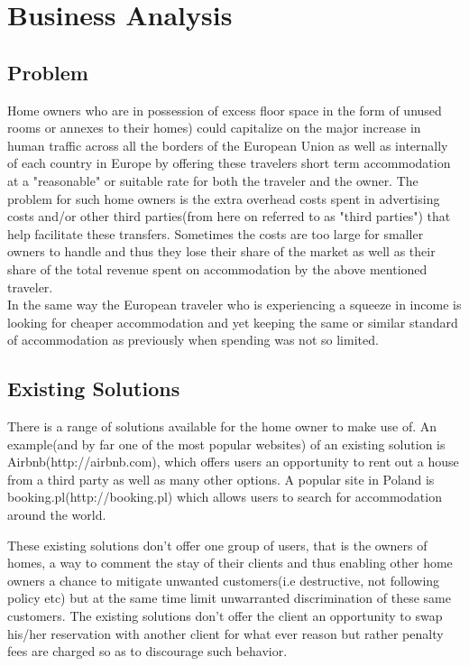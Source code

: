 \chapter{Business Analysis}
\section{Problem}
Home owners who are in possession of excess floor space in the form of unused rooms or annexes to their homes) could capitalize on the major increase in human traffic across all the borders of the European Union as well as internally of each country in Europe by offering these travelers short term accommodation at a "reasonable" or suitable rate for both the traveler and the owner. The problem for such home owners is the extra overhead costs spent in advertising costs and/or other third parties(from here on referred to as "third parties") that help facilitate these transfers. Sometimes the costs are too large for smaller owners to handle and thus they lose their share of the market as well as their share of the total revenue spent on accommodation by the above mentioned traveler.\\
In the same way the European traveler who is experiencing a squeeze in income is looking for cheaper accommodation and yet keeping the same or similar standard of accommodation as previously when spending was not so limited. 

\section{Existing Solutions}
There is a range of solutions available for the home owner to make use of. An example(and by far one of the most popular websites) of an existing solution is Airbnb(http://airbnb.com), which offers users an opportunity to rent out a house from a third party as well as many other options. A popular site in Poland is booking.pl(http://booking.pl) which allows users to search for accommodation around the world. 

These existing solutions don't offer one group of users, that is the owners of homes, a way to comment the stay of their clients and thus enabling other home owners a chance to mitigate unwanted customers(i.e destructive, not following policy etc) but at the same time limit unwarranted discrimination of these same customers. The existing solutions don't offer the client an opportunity to swap his/her reservation with another client for what ever reason but rather penalty fees are charged so as to discourage such behavior. 

